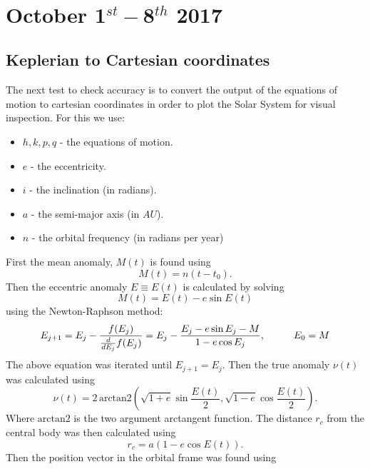 \documentclass[11pt, oneside]{article}   	%
\begin{document}
\newpage
\
\newpage

\section{October 1$^{st} - $8$^{th}$ 2017}

\subsection{Keplerian to Cartesian coordinates}
\label{kep2cart}

The next test to check accuracy is to convert the output of the equations of motion to cartesian coordinates in order to plot the Solar System for visual inspection. For this we use:
\begin{itemize}
\item $h, k, p, q$ - the equations of motion.
\item $e$ - the eccentricity.
\item $i$ - the inclination (in radians).
\item $a$ - the semi-major axis (in $AU$).
\item $n$ - the orbital frequency (in radians per year)
\end{itemize}
First the mean anomaly, $M(t)$ is found using
\begin{equation}
M(t) = n(t-t_{0}).
\end{equation}
Then the eccentric anomaly $E \equiv E(t)$ is calculated by solving
\begin{equation}
M(t) = E(t) - e\sin E(t)
\end{equation}
using the Newton-Raphson method:
\begin{equation}
E_{j+1} = E_{j} - \frac{f(E_{j})}{\frac{d}{dE_{j}}f(E_{j})} = E_{j} - \frac{E_{j} - e\sin E_{j} - M}{1-e\cos E_{j}}, \hspace*{1cm} E_{0}=M
\end{equation}
The above equation was iterated until $E_{j+1} = E_{j}$. Then the true anomaly $\nu(t)$ was calculated using
\begin{equation}
\nu(t) = 2 \, \text{arctan2} \left (\sqrt{1+e} \sin \frac{E(t)}{2}, \sqrt{1-e} \cos \frac{E(t)}{2} \right).
\end{equation}
Where $ \text{arctan2}$ is the two argument arctangent function. The distance $r_{c}$ from the central body was then calculated using
\begin{equation}
r_{c} = a(1-e \cos E(t)).
\end{equation}
Then the position vector in the orbital frame was found using
\end{document}
